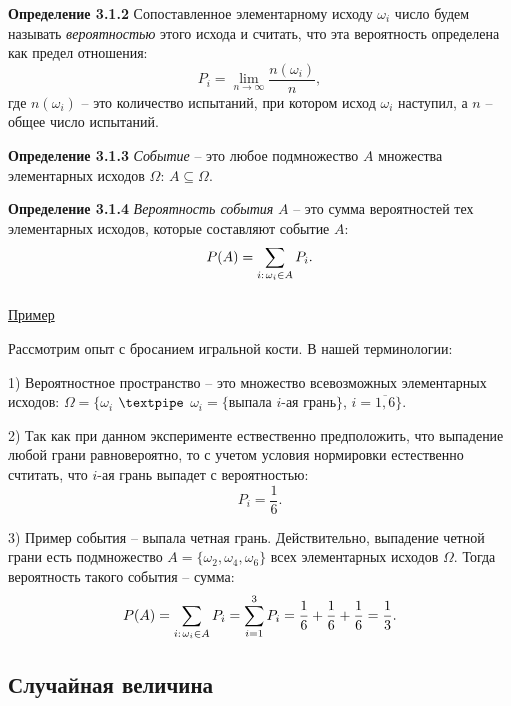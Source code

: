\documentclass[12pt,a4paper]{article}
\begin{document}
\textbf{Определение 3.1.2} 
Сопоставленное элементарному исходу $\omega_i$ число будем называть \textit{вероятностью} этого исхода и считать, что эта вероятность определена как предел отношения:
\[ P_i = \lim_{n \to \infty} \frac{n(\omega_i)}{n},\]
где $n(\omega_i)$ -- это количество испытаний, при котором исход $\omega_i$ наступил, а $n$ --  общее число испытаний.

\textbf{Определение 3.1.3}
\textit{Событие} -- это любое подмножество $A$ множества элементарных исходов $\Omega$: $A \subseteq \Omega$. 

\textbf{Определение 3.1.4}
\textit{Вероятность события} $A$ -- это сумма вероятностей тех элементарных исходов, которые составляют событие $A$:
\[P(A) = \sum_{i: \hspace{1px} \omega_i \in A} P_i. \]

\subparagraph{}
\underline{Пример}

Рассмотрим опыт с бросанием игральной кости. В нашей терминологии:

1) Вероятностное пространство -- это множество всевозможных элементарных исходов: $\Omega = \{ \omega_i $ $\textpipe$  $\omega_i = \{$выпала $i$-ая грань$\}$, $i = \overline{1, 6} \}$.

2) Так как при данном эксперименте ествественно предположить, что выпадение любой грани равновероятно, то с учетом условия нормировки естественно счтитать, что $i$-ая грань выпадет с вероятностью:
\[P_i = \frac{1}{6}.\]

3) Пример события -- выпала четная грань. Действительно, выпадение четной грани есть подмножество     $A = \{\omega_2, \omega_4, \omega_6 \}$ всех элементарных исходов $\Omega$. Тогда вероятность такого события -- сумма:
\[P(A) = \sum_{i: \hspace{1px} \omega_i \in A} P_i = \sum_{i = 1}^3 P_i = \frac{1}{6} + \frac{1}{6} + \frac{1}{6} = \frac{1}{3}. \]


\subsection{Случайная величина}
\end{document}
